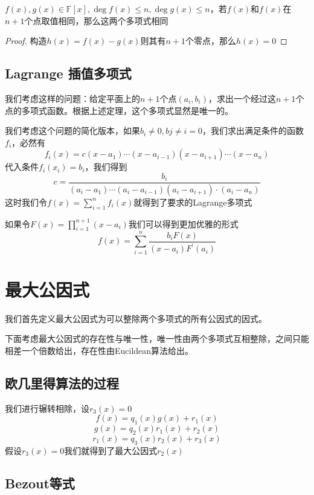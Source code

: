 \documentclass{ctexart}
\begin{document}
\begin{proposition}
    $f(x),g(x) \in \mathbb{F}[x],\deg f(x) \leq n,\deg g(x) \leq n$，若$f(x)$和$f(x)$在$n + 1$个点取值相同，那么这两个多项式相同
\end{proposition}
\begin{proof}
    构造$h(x) = f(x) - g(x)$则其有$n + 1$个零点，那么$h(x) = 0$
\end{proof}

\subsection{Lagrange 插值多项式}
我们考虑这样的问题：给定平面上的$n + 1$个点$(a_i,b_i)$，求出一个经过这$n +1$个点的多项式函数。根据上述定理，这个多项式显然是唯一的。

我们考虑这个问题的简化版本，如果$b_i \neq 0,b{j \neq i} = 0$，我们求出满足条件的函数$f_i$，必然有
\begin{equation*}
    f_i(x) = c(x - a_1)\cdots(x - a_{i - 1})(x - a_{i + 1})\cdots(x - a_n)
\end{equation*}
代入条件$f_i(x_i) = b_i$，我们得到
\begin{equation*}
    c = \frac{b_i}{(a_i - a_1)\cdots(a_i - a_{i -1})(a_i - a_{i + 1})\cdot(a_i - a_n)}
\end{equation*}
这时我们令$f(x) = \sum_{i = 1}^n f_i(x)$就得到了要求的Lagrange多项式

如果令$F(x) = \prod_{i = 1}^{n + 1} (x - a_i)$我们可以得到更加优雅的形式
\begin{equation*}
    f(x) = \sum_{i = 1}^n\frac{b_i F(x)}{(x - a_i)F^\prime(a_i)}
\end{equation*}

\section{最大公因式}

我们首先定义最大公因式为可以整除两个多项式的所有公因式的因式。

下面考虑最大公因式的存在性与唯一性，唯一性由两个多项式互相整除，之间只能相差一个倍数给出，存在性由Eucildean算法给出。
\subsection{欧几里得算法的过程}
我们进行辗转相除，设$r_3(x) = 0$
$$f(x) = q_1(x) g(x) + r_1(x)$$
$$g(x) = q_2(x)r_1(x) + r_2(x)$$
$$r_1(x) = q_3(x)r_2(x) + r_3(x)$$
假设$r_3(x) = 0$我们就得到了最大公因式$r_2(x)$
\subsection{Bezout等式}
\end{document}
